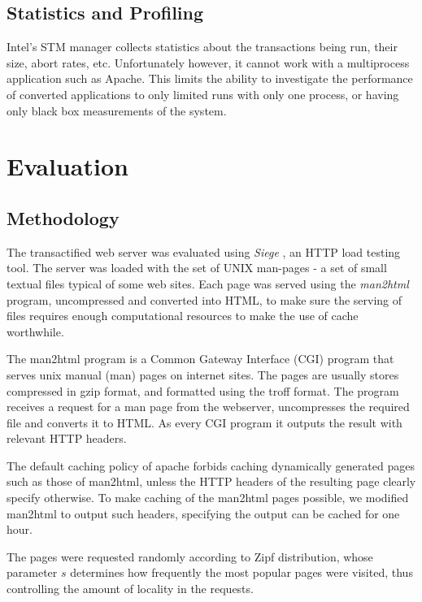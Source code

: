 \documentclass[preprint,11pt]{sigplanconf}
\let \cite = \citep
\begin{document}

\subsection{Statistics and Profiling}\label{sec:wishlist-statistics}
Intel's STM manager collects statistics about the transactions being run, their
size, abort rates, etc. Unfortunately however, it cannot work with a
multiprocess application such as Apache. This limits the ability to investigate
the performance of converted applications to only limited runs with only one
process, or having only black box measurements of the system.

\section{Evaluation}\label{sec:evaluation}
\subsection{Methodology} 
The transactified web server was evaluated using \emph{Siege} \cite{siege}, an
HTTP load testing tool. The server was loaded with the set of UNIX man-pages - a
set of small textual files typical of some web sites. Each page was served using
the \emph{man2html} program, uncompressed and converted into HTML, to make sure
the serving of files requires enough computational resources to make the use of
cache worthwhile.

The man2html program is a Common Gateway Interface (CGI) program that serves
unix manual (man) pages on internet sites. The pages are usually stores
compressed in gzip format, and formatted using the troff format. The program
receives a request for a man page from the webserver, uncompresses the required
file and converts it to HTML. As every CGI program it outputs the result with
relevant HTTP headers.

The default caching policy of apache forbids caching dynamically generated pages
such as those of man2html, unless the HTTP headers of the resulting page clearly
specify otherwise. To make caching of the man2html pages possible, we modified
man2html to output such headers, specifying the output can be cached for one
hour.

The pages were requested randomly according to Zipf distribution, whose
parameter $s$ determines how frequently the most popular pages were visited,
thus controlling the amount of locality in the requests.
\end{document}
